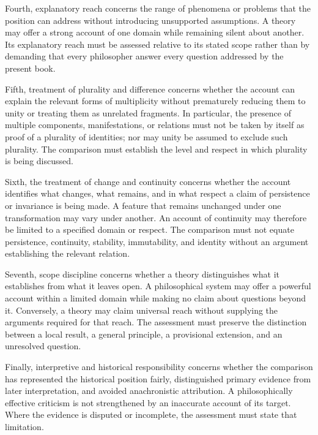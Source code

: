 \label{para:VS.B01.P01.C08.S01.SS05.P005}
Fourth, explanatory reach concerns the range of phenomena
or problems that the position can address without
introducing unsupported assumptions. A theory may offer
a strong account of one domain while remaining silent
about another. Its explanatory reach must be assessed
relative to its stated scope rather than by demanding
that every philosopher answer every question addressed
by the present book.

\label{para:VS.B01.P01.C08.S01.SS05.P006}
Fifth, treatment of plurality and difference concerns
whether the account can explain the relevant forms of
multiplicity without prematurely reducing them to unity
or treating them as unrelated fragments. In particular,
the presence of multiple components, manifestations, or
relations must not be taken by itself as proof of a
plurality of identities; nor may unity be assumed to
exclude such plurality. The comparison must establish
the level and respect in which plurality is being
discussed.

\label{para:VS.B01.P01.C08.S01.SS05.P007}
Sixth, the treatment of change and continuity concerns
whether the account identifies what changes, what remains,
and in what respect a claim of persistence or invariance
is being made. A feature that remains unchanged under
one transformation may vary under another. An account
of continuity may therefore be limited to a specified
domain or respect. The comparison must not equate
persistence, continuity, stability, immutability, and
identity without an argument establishing the relevant
relation.

\label{para:VS.B01.P01.C08.S01.SS05.P008}
Seventh, scope discipline concerns whether a theory
distinguishes what it establishes from what it leaves
open. A philosophical system may offer a powerful
account within a limited domain while making no claim
about questions beyond it. Conversely, a theory may
claim universal reach without supplying the arguments
required for that reach. The assessment must preserve
the distinction between a local result, a general
principle, a provisional extension, and an unresolved
question.

\label{para:VS.B01.P01.C08.S01.SS05.P009}
Finally, interpretive and historical responsibility
concerns whether the comparison has represented the
historical position fairly, distinguished primary
evidence from later interpretation, and avoided
anachronistic attribution. A philosophically effective
criticism is not strengthened by an inaccurate account
of its target. Where the evidence is disputed or
incomplete, the assessment must state that limitation.

